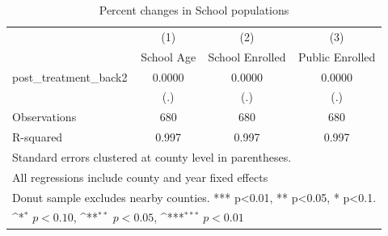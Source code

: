 \begin{table}[htbp]\centering
\def\sym#1{\ifmmode^{#1}\else\(^{#1}\)\fi}
\caption{Percent changes in School populations}
\begin{tabular}{l*{3}{c}}
\hline\hline
            &\multicolumn{1}{c}{(1)}&\multicolumn{1}{c}{(2)}&\multicolumn{1}{c}{(3)}\\
            &\multicolumn{1}{c}{School Age}&\multicolumn{1}{c}{School Enrolled}&\multicolumn{1}{c}{Public Enrolled}\\
\hline
post\_treatment\_back2&      0.0000         &      0.0000         &      0.0000         \\
            &         (.)         &         (.)         &         (.)         \\
\hline
Observations&         680         &         680         &         680         \\
R-squared   &       0.997         &       0.997         &       0.997         \\
\hline\hline

\multicolumn{4}{l}{\footnotesize Standard errors clustered at county level in parentheses.}\\
\multicolumn{4}{l}{\footnotesize All regressions include county and year fixed effects}\\
\multicolumn{4}{l}{\footnotesize Donut sample excludes nearby counties. *** p<0.01, ** p<0.05, * p<0.1.}\\
\multicolumn{4}{l}{\footnotesize \sym{*} \(p<0.10\), \sym{**} \(p<0.05\), \sym{***} \(p<0.01\)}\\
\end{tabular}
\end{table}
